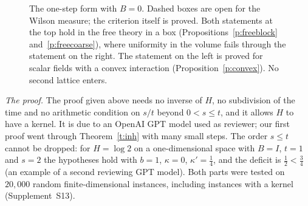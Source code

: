 \begin{figure}[htbp]
\centering
{}
\caption{The one-step form with $B=0$. Dashed boxes are open for the Wilson measure; the criterion itself
is proved. Both statements at the top hold in the free theory in a box (Propositions~\ref{p:freeblock}
and~\ref{p:freecoarse}), where uniformity in the volume fails through the statement on the right. The
statement on the left is proved for scalar fields with a convex interaction
(Proposition~\ref{p:convex}). No second lattice enters.}
\label{f:onestep}
\end{figure}

\emph{The proof.} The proof given above needs no inverse of $H$, no subdivision of the time and no
arithmetic condition on $s/t$ beyond $0<s\le t$, and it allows $H$ to have a kernel. It is due to an OpenAI
GPT model used as reviewer; our first proof went through Theorem~\ref{t:inh} with many small steps. The
order $s\le t$ cannot be dropped: for $H=\log2$ on a one-dimensional space with $B=I$, $t=1$ and $s=2$ the
hypotheses hold with $b=1$, $\kappa=0$, $\kappa'=\tfrac14$, and the deficit is $\tfrac12<\tfrac34$ (an
example of a second reviewing GPT model). Both parts were tested on $20{,}000$ random finite-dimensional
instances, including instances with a kernel (Supplement~S13).

